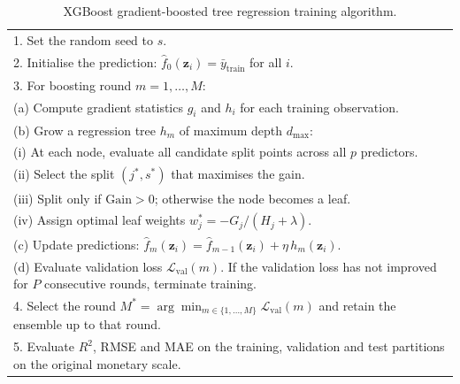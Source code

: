 \begin{table}[H]
{\begin{tabular}{p{}}
1. Set the random seed to $s$. \\
2. Initialise the prediction:
   $\hat{f}_{0}(\mathbf{z}_i) = \bar{y}_{\mathrm{train}}$
   for all $i$. \\
3. For boosting round $m = 1, \ldots, M$: \\
\quad (a) Compute gradient statistics $g_i$ and $h_i$ for each
        training observation. \\
\quad (b) Grow a regression tree $h_m$ of maximum depth $d_{\max}$: \\
\quad\quad (i) At each node, evaluate all candidate split points
            across all $p$ predictors. \\
\quad\quad (ii) Select the split $(j^{*}, s^{*})$ that maximises
            the gain. \\
\quad\quad (iii) Split only if $\mathrm{Gain} > 0$; otherwise the
            node becomes a leaf. \\
\quad\quad (iv) Assign optimal leaf weights
            $w_j^{*} = -G_j / (H_j + \lambda)$. \\
\quad (c) Update predictions:
        $\hat{f}_{m}(\mathbf{z}_i)
        = \hat{f}_{m-1}(\mathbf{z}_i) + \eta \, h_m(\mathbf{z}_i)$. \\
\quad (d) Evaluate validation loss
        $\mathcal{L}_{\mathrm{val}}(m)$. If the validation loss
        has not improved for $P$ consecutive rounds, terminate
        training. \\
4. Select the round
   $M^{*} = \arg\min_{m \in \{1,\ldots,M\}}
   \mathcal{L}_{\mathrm{val}}(m)$
   and retain the ensemble up to that round. \\
5. Evaluate \ensuremath{R^2}, RMSE and MAE on the training,
   validation and test partitions on the original monetary scale. \\
\bottomrule
\end{tabular}}
\caption{XGBoost gradient-boosted tree regression training algorithm.}
\label{tab:xgb_algorithm_annex}
\end{table}

